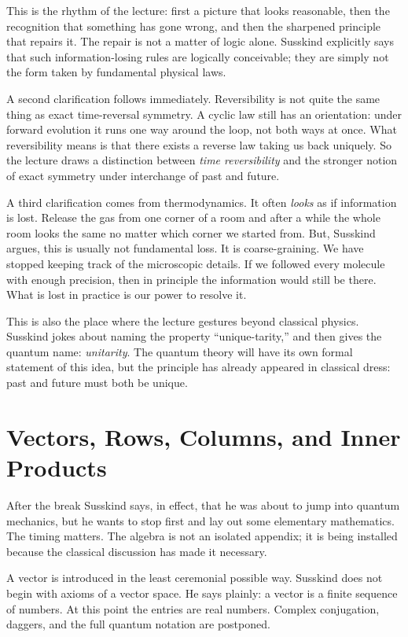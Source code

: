 This is the rhythm of the lecture: first a picture that looks reasonable, then the recognition that something has gone wrong, and then the sharpened principle that repairs it. The repair is not a matter of logic alone. Susskind explicitly says that such information-losing rules are logically conceivable; they are simply not the form taken by fundamental physical laws.

A second clarification follows immediately. Reversibility is not quite the same thing as exact time-reversal symmetry. A cyclic law still has an orientation: under forward evolution it runs one way around the loop, not both ways at once. What reversibility means is that there exists a reverse law taking us back uniquely. So the lecture draws a distinction between \emph{time reversibility} and the stronger notion of exact symmetry under interchange of past and future.

A third clarification comes from thermodynamics. It often \emph{looks} as if information is lost. Release the gas from one corner of a room and after a while the whole room looks the same no matter which corner we started from. But, Susskind argues, this is usually not fundamental loss. It is coarse-graining. We have stopped keeping track of the microscopic details. If we followed every molecule with enough precision, then in principle the information would still be there. What is lost in practice is our power to resolve it.

This is also the place where the lecture gestures beyond classical physics. Susskind jokes about naming the property ``unique-tarity,'' and then gives the quantum name: \emph{unitarity}. The quantum theory will have its own formal statement of this idea, but the principle has already appeared in classical dress: past and future must both be unique.

\section{Vectors, Rows, Columns, and Inner Products}

After the break Susskind says, in effect, that he was about to jump into quantum mechanics, but he wants to stop first and lay out some elementary mathematics. The timing matters. The algebra is not an isolated appendix; it is being installed because the classical discussion has made it necessary.

A vector is introduced in the least ceremonial possible way. Susskind does not begin with axioms of a vector space. He says plainly: a vector is a finite sequence of numbers. At this point the entries are real numbers. Complex conjugation, daggers, and the full quantum notation are postponed.

